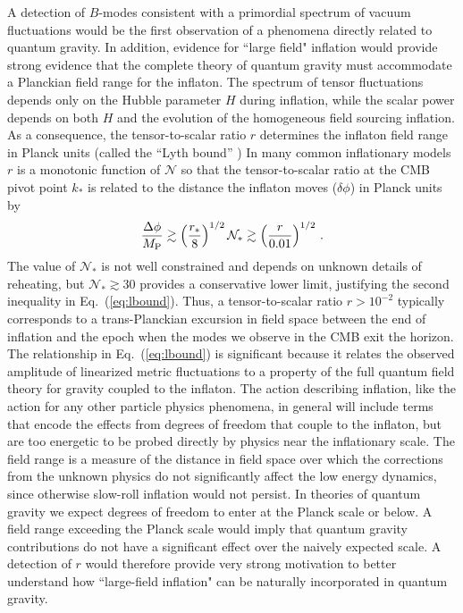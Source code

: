A detection of $B$-modes consistent with a primordial spectrum of vacuum fluctuations would be the first observation of a phenomena directly related to quantum gravity. In addition, evidence for ``large field" inflation would provide strong evidence that the complete theory of quantum gravity must accommodate a Planckian field range for the inflaton. The spectrum of tensor fluctuations depends only on the Hubble parameter $H$ during inflation, while the scalar power depends on both $H$ and the evolution of the homogeneous field sourcing inflation. As a consequence, the tensor-to-scalar ratio $r$ determines the inflaton field range in Planck units (called the ``Lyth bound'' \cite{Lyth:1996im})
In many common inflationary models $r$ is a monotonic function of $\mathcal{N}$ so that the tensor-to-scalar ratio at the CMB pivot point $k_*$ is related to the distance the inflaton moves ($\delta\phi$) in Planck units by
\begin{equation}
\label{eq:lbound}
\frac{\Delta\phi}{M_{\rm P}}\gtrsim \left(\frac{r_\ast}{8}\right)^{1/2}\mathcal{N}_\ast\gtrsim \left(\frac{r}{0.01}\right)^{1/2}\,.
\end{equation}  
The value of $\mathcal{N}_\ast$ is not well constrained and depends on unknown details of reheating, but $\mathcal{N}_\ast\gtrsim 30$ provides a conservative lower limit, justifying the second inequality in Eq.~(\ref{eq:lbound}). Thus, a tensor-to-scalar ratio $r>10^{-2}$ typically corresponds to a trans-Planckian excursion in field space between the end of inflation and the epoch when the modes we observe in the CMB exit the horizon. The relationship in Eq.~(\ref{eq:lbound}) is significant because it relates the observed amplitude of linearized metric fluctuations to a property of the full quantum field theory for gravity coupled to the inflaton. The action describing inflation, like the action for any other particle physics phenomena, in general will include terms that encode the effects from degrees of freedom that couple to the inflaton, but are too energetic to be probed directly by physics near the inflationary scale. The field range is a measure of the distance in field space over which the corrections from the unknown physics do not significantly affect the low energy dynamics, since otherwise slow-roll inflation would not persist. In theories of quantum gravity we expect degrees of freedom to enter at the Planck scale or below. A field range exceeding the Planck scale would imply that quantum gravity contributions do not have a significant effect over the naively expected scale. A detection of $r$ would therefore provide very strong motivation to better understand how ``large-field inflation" can be naturally incorporated in quantum gravity.

